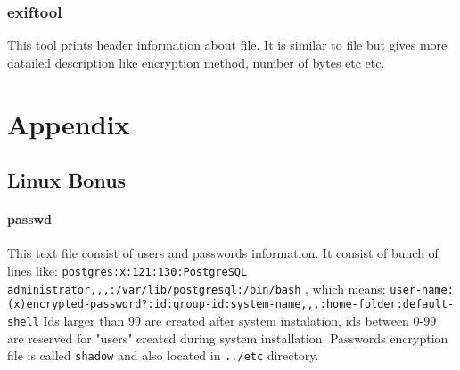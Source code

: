 \documentclass{article}[12pt]
\begin{document}
\subsubsection{exiftool}
\label{subsubsec:exiftool}
This tool prints header information about file.
It is similar to file but gives more datailed description like encryption method, number of bytes etc etc.




\section{Appendix}

\subsection{Linux Bonus}
\paragraph{passwd} This text file consist of users and passwords information.
It consist of bunch of lines like: \newline
\texttt{postgres:x:121:130:PostgreSQL administrator,,,:/var/lib/postgresql:/bin/bash} , which means:
\texttt{user-name:(x)encrypted-password?:id:group-id:system-name,,,:home-folder:default-shell} \newline
Ids larger than 99 are created after system instalation, ids between 0-99 are reserved for "users" created during system installation.
Passwords encryption file is called \texttt{shadow} and also located in \texttt{../etc} directory.

\end{document}
